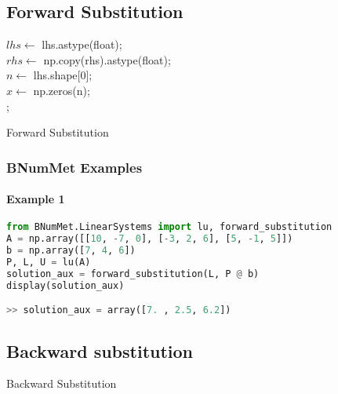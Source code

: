\subsection{Forward Substitution}
\begin{algorithm}[H]
$lhs \gets$ lhs.astype(float);\\
$rhs \gets$ np.copy(rhs).astype(float);\\
$n \gets$ lhs.shape[0];\\
$x \gets$ np.zeros(n);\\

;
\caption{Forward Substitution}
\end{algorithm}
\subsubsection{BNumMet Examples}
\paragraph{Example 1}{
\begin{lstlisting}[language=Python]
from BNumMet.LinearSystems import lu, forward_substitution
A = np.array([[10, -7, 0], [-3, 2, 6], [5, -1, 5]])
b = np.array([7, 4, 6])
P, L, U = lu(A)
solution_aux = forward_substitution(L, P @ b)
display(solution_aux)

>> solution_aux = array([7. , 2.5, 6.2])
\end{lstlisting}
}



\subsection{Backward substitution}
\begin{algorithm}[H]
\SetAlgoLined
{}
\caption{Backward Substitution}
\end{algorithm}
